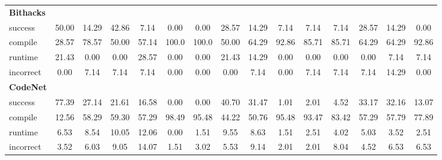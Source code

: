 \begin{table}[t]
\begin{tabular}{@{}lcccccccccccccc@{}}
\textbf{Bithacks} & & & & & & & & & & & & & & \\ 
\quad success & 50.00 & 14.29 & 42.86 & 7.14 & 0.00 & 0.00 & 28.57 & 14.29 & 7.14 & 7.14 & 7.14 & 28.57 & 14.29 & 0.00 \\
\qquad compile & 28.57 & 78.57 & 50.00 & 57.14 & 100.0 & 100.0 & 50.00 & 64.29 & 92.86 & 85.71 & 85.71 & 64.29 & 64.29 & 92.86 \\
\qquad runtime & 21.43 & 0.00 & 0.00 & 28.57 & 0.00 & 0.00 & 21.43 & 14.29 & 0.00 & 0.00 & 0.00 & 0.00 & 7.14 & 7.14 \\
\qquad incorrect & 0.00 & 7.14 & 7.14 & 7.14 & 0.00 & 0.00 & 0.00 & 7.14 & 0.00 & 7.14 & 7.14 & 7.14 & 14.29 & 0.00 \\
 

\textbf{CodeNet} & & & & & & & & & & & & & & \\ 
\quad success & 77.39 & 27.14 & 21.61 & 16.58 & 0.00 & 0.00 & 40.70 & 31.47 & 1.01 & 2.01 & 4.52 & 33.17 & 32.16 & 13.07 \\
\qquad compile & 12.56 & 58.29 & 59.30 & 57.29 & 98.49 & 95.48 & 44.22 & 50.76 & 95.48 & 93.47 & 83.42 & 57.29 & 57.79 & 77.89 \\
\qquad runtime & 6.53 & 8.54 & 10.05 & 12.06 & 0.00 & 1.51 & 9.55 & 8.63 & 1.51 & 2.51 & 4.02 & 5.03 & 3.52 & 2.51 \\
\qquad incorrect & 3.52 & 6.03 & 9.05 & 14.07 & 1.51 & 3.02 & 5.53 & 9.14 & 2.01 & 2.01 & 8.04 & 4.52 & 6.53 & 6.53 \\
 

\bottomrule
\end{tabular}
\end{table}




